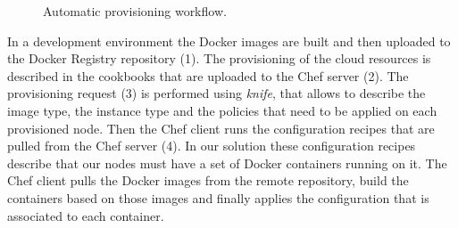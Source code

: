 \begin{figure}[ht!]
  \centering
  \caption[Automatic provisioning workflow.]{Automatic provisioning workflow.}
  \label{fig:provisioning_tech_architecture}
\end{figure}

In a development environment the Docker images are built and then uploaded to the Docker Registry
repository (1). The provisioning of the cloud resources is described in the cookbooks that are uploaded
to the Chef server (2). The provisioning request (3) is performed using \textit{knife}, that allows to
describe the image type, the instance type and the policies that need to be applied on each provisioned node.
Then the Chef client runs the configuration recipes that are pulled from the Chef server (4). In our
solution these configuration recipes describe that our nodes must have a set of Docker containers
running on it. The Chef client pulls the Docker images from the remote repository, build the containers
based on those images and finally applies the configuration that is associated to each container.\\

